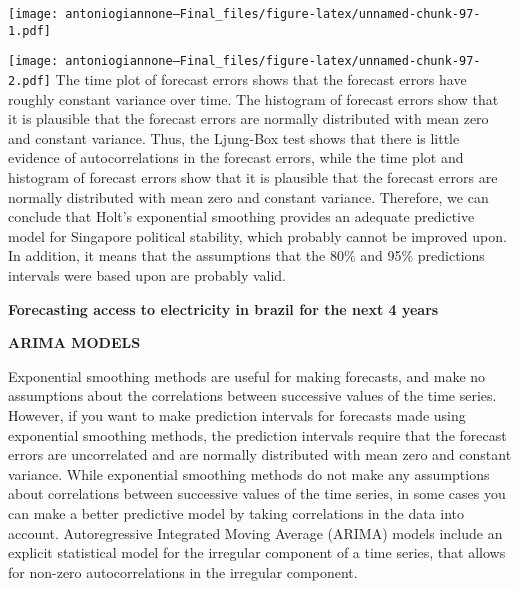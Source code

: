 \documentclass[
]{article}
\newenvironment{Shaded}{\begin{snugshade}}{\end{snugshade}}
\newcommand{\FunctionTok}[1]{\textcolor[rgb]{0.13,0.29,0.53}{\textbf{#1}}}
\newcommand{\NormalTok}[1]{#1}
\newcommand{\OtherTok}[1]{\textcolor[rgb]{0.56,0.35,0.01}{#1}}
\newcommand{\SpecialCharTok}[1]{\textcolor[rgb]{0.81,0.36,0.00}{\textbf{#1}}}
\begin{document}
\begin{Shaded}
\end{Shaded}

\texttt{[image: antoniogiannone---Final\_files/figure-latex/unnamed-chunk-97-1.pdf]}

\begin{Shaded}
\end{Shaded}

\texttt{[image: antoniogiannone---Final\_files/figure-latex/unnamed-chunk-97-2.pdf]}
The time plot of forecast errors shows that the forecast errors have
roughly constant variance over time. The histogram of forecast errors
show that it is plausible that the forecast errors are normally
distributed with mean zero and constant variance. Thus, the Ljung-Box
test shows that there is little evidence of autocorrelations in the
forecast errors, while the time plot and histogram of forecast errors
show that it is plausible that the forecast errors are normally
distributed with mean zero and constant variance. Therefore, we can
conclude that Holt's exponential smoothing provides an adequate
predictive model for Singapore political stability, which probably
cannot be improved upon. In addition, it means that the assumptions that
the 80\% and 95\% predictions intervals were based upon are probably
valid.

\textbf{Forecasting access to electricity in brazil for the next 4
years}

\textbf{ARIMA MODELS}

Exponential smoothing methods are useful for making forecasts, and make
no assumptions about the correlations between successive values of the
time series. However, if you want to make prediction intervals for
forecasts made using exponential smoothing methods, the prediction
intervals require that the forecast errors are uncorrelated and are
normally distributed with mean zero and constant variance. While
exponential smoothing methods do not make any assumptions about
correlations between successive values of the time series, in some cases
you can make a better predictive model by taking correlations in the
data into account. Autoregressive Integrated Moving Average (ARIMA)
models include an explicit statistical model for the irregular component
of a time series, that allows for non-zero autocorrelations in the
irregular component.
\end{document}
